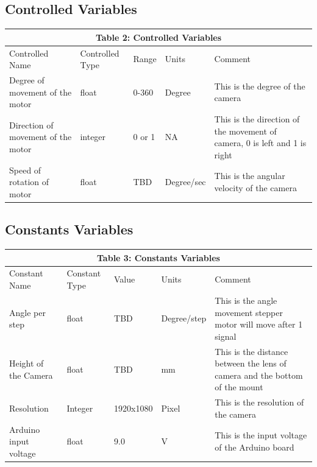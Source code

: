 \documentclass[12pt, titlepage]{article}
\begin{document}
\subsection{Controlled Variables}
\begin{tabular}{|p{}|p{}|p{}|p{}|p{}|}

\hline \multicolumn{5}{|c|}{Table 2: Controlled Variables}\\

\hline Controlled Name&Controlled Type&Range&Units &Comment\\
\hline Degree of movement of the motor&float&0-360&Degree&This is the degree of the camera\\
\hline Direction of movement of the motor&integer&0 or 1&NA&This is the direction of the movement of camera, 0 is left and 1 is right\\
\hline Speed of rotation of motor&float&TBD&Degree/sec&This is the angular velocity of the camera\\


\hline

\end{tabular}
\subsection{Constants Variables}
\begin{tabular}{|p{}|p{}|p{}|p{}|p{}|}

\hline \multicolumn{5}{|c|}{Table 3: Constants Variables}\\

\hline Constant Name&Constant Type&Value&Units &Comment\\

\hline Angle per step&float&TBD&Degree/step&This is the angle movement stepper motor will move after 1 signal \\

\hline Height of the Camera&float&TBD&mm&This is the distance between the lens of camera and the bottom of the mount\\

\hline Resolution&Integer&1920x1080&Pixel&This is the resolution of the camera\\
\hline Arduino input voltage&float&9.0&V&This is the input voltage of the Arduino board\\


\hline

\end{tabular}
\end{document}
